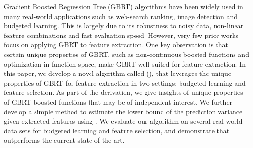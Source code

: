 
Gradient Boosted Regression Tree (GBRT) algorithms have been widely used in many real-world applications such as web-search ranking, image detection and budgeted learning. This is largely due to its robustness to noisy data, non-linear feature combinations and fast evaluation speed. However, very few prior works focus on applying GBRT to feature extraction. One key observation is that certain 
unique properties of GBRT, such as non-continuous boosted functions and optimization in function space, make GBRT well-suited for feature extraction. In this paper, we develop a novel algorithm called \fullname{} (\name{}), that leverages the unique properties of GBRT for feature extraction in two settings: budgeted learning and feature selection. 
As part of the derivation, we give insights of unique properties of GBRT boosted functions that may be of independent interest. We further develop a simple method to estimate the lower bound of the prediction variance given extracted features using \name{}. We evaluate our algorithm on several real-world data sets for budgeted learning and feature selection, and demonstrate that \name{} outperforms the current state-of-the-art.